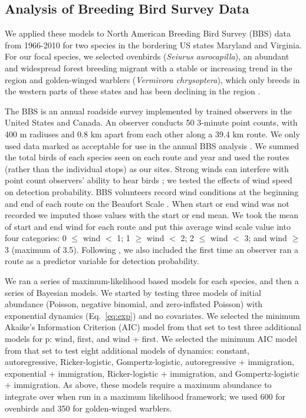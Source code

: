 \documentclass[12pt]{article}
\begin{document}
\subsection{Analysis of Breeding Bird Survey Data}

We applied these models to North American Breeding Bird Survey
(BBS) data from 1966-2010 for two species in the bordering US states
Maryland and Virginia. For our focal species, we selected
ovenbirds (\textit{Seiurus aurocapilla}), an abundant and widespread
forest breeding migrant with a stable or increasing trend in the region \citep{porneluzi_etal:2011}
and golden-winged warblers (\textit{Vermivora chrysoptera}), which
only breeds in the western parts of these states and has been declining in the
region \citep{confer_etal:2011}.  %

The BBS is an annual roadside survey implemented by trained
observers in the United States and Canada. An observer conducts 50
3-minute point counts, with 400 m radiuses and 0.8 km apart from each other along a
39.4 km route. We only used data marked as acceptable for use in the annual BBS
analysis \citep{sauer_etal:1994auk}.  We summed the total birds of each
species seen on each route and year and used the routes (rather
than the individual stops) as our sites.
Strong winds can interfere with point count observers' ability
to hear birds \citep{simons_etal:2007}; we tested the effects of wind
speed on detection probability. BBS volunteers record wind conditions
at the beginning and end of each route on the Beaufort Scale
\citep[start and end wind]{robbins_etal:1986}.
When start or end wind was not recorded we imputed those values with
the start or end mean. We took the mean of start and end wind for
each route and put this average wind scale value into four
categories: 0 $\leq$ wind $<$ 1; 1 $\geq$ wind $<$ 2; 2 $\leq$ wind $<$ 3; and wind
$\geq$ 3 (maximum of 3.5).
Following \citet{link_sauer:2002},
we also included the first time an observer ran a route as a predictor variable for detection
probability.

We ran a series of maximum-likelihood based models for each
species, and then a series of Bayesian models. We started by testing
three models of initial abundance (Poisson, negative binomial, and
zero-inflated Poisson) with exponential dynamics
(Eq.~\ref{eq:exp}) and no covariates.  We selected the minimum Akaike's Information
Criterion (AIC) model from that set to test three additional
models for p: wind, first, and wind + first. We selected the minimum
AIC model from that set to test eight additional models of dynamics:
constant, autoregressive, Ricker-logistic, Gompertz-logistic, autoregressive +
immigration, exponential + immigration, Ricker-logistic +
immigration, and Gompertz-logistic + immigration. %
As above, these models require a maximum abundance to integrate
over when run in a maximum likelihood
framework; we used 600 for ovenbirds and 350 for golden-winged warblers.
\end{document}
